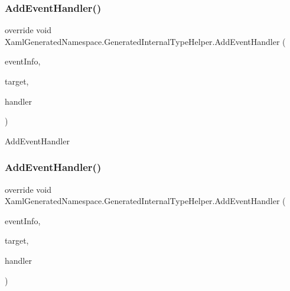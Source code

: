 \subsubsection{\texorpdfstring{Add\+Event\+Handler()}{AddEventHandler()}\hspace{0.1cm}{\footnotesize\ttfamily [1/4]}}
{\footnotesize\ttfamily override void Xaml\+Generated\+Namespace.\+Generated\+Internal\+Type\+Helper.\+Add\+Event\+Handler (\begin{DoxyParamCaption}\item[{System.\+Reflection.\+Event\+Info}]{event\+Info,  }\item[{object}]{target,  }\item[{System.\+Delegate}]{handler }\end{DoxyParamCaption})\hspace{0.3cm}{\ttfamily [protected]}}



Add\+Event\+Handler 

\mbox{\label{class_xaml_generated_namespace_1_1_generated_internal_type_helper_a73471f4a6d1ca4c4fceec9ad8610f0c8}} 
\subsubsection{\texorpdfstring{Add\+Event\+Handler()}{AddEventHandler()}\hspace{0.1cm}{\footnotesize\ttfamily [2/4]}}
{\footnotesize\ttfamily override void Xaml\+Generated\+Namespace.\+Generated\+Internal\+Type\+Helper.\+Add\+Event\+Handler (\begin{DoxyParamCaption}\item[{System.\+Reflection.\+Event\+Info}]{event\+Info,  }\item[{object}]{target,  }\item[{System.\+Delegate}]{handler }\end{DoxyParamCaption})\hspace{0.3cm}{\ttfamily [protected]}}



